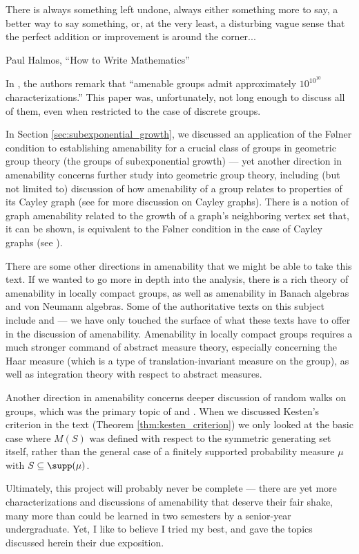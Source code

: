 \epigraph{There is always something left undone, always either something more to say, a better way to say something, or, at the very least, a disturbing vague sense that the perfect addition or improvement is around the corner...}{Paul Halmos, ``How to Write Mathematics''}
In \cite[48]{brown_and_ozawa}, the authors remark that ``amenable groups admit approximately $10^{10^{10}}$ characterizations.'' This paper was, unfortunately, not long enough to discuss all of them, even when restricted to the case of discrete groups.\newline

In Section \ref{sec:subexponential_growth}, we discussed an application of the Følner condition to establishing amenability for a crucial class of groups in geometric group theory (the groups of subexponential growth) --- yet another direction in amenability concerns further study into geometric group theory, including (but not limited to) discussion of how amenability of a group relates to properties of its Cayley graph (see \cite[Section 3.2]{loh_geometric_group_theory} for more discussion on Cayley graphs). There is a notion of graph amenability related to the growth of a graph's neighboring vertex set that, it can be shown, is equivalent to the Følner condition in the case of Cayley graphs (see \cite{monfared_cayley_graphs}).\newline

There are some other directions in amenability that we might be able to take this text. If we wanted to go more in depth into the analysis, there is a rich theory of amenability in locally compact groups, as well as amenability in Banach algebras and von Neumann algebras. Some of the authoritative texts on this subject include \cite{kazhdan_property_t} and \cite{amenable_banach_algebras} --- we have only touched the surface of what these texts have to offer in the discussion of amenability. Amenability in locally compact groups requires a much stronger command of abstract measure theory, especially concerning the Haar measure (which is a type of translation-invariant measure on the group), as well as integration theory with respect to abstract measures.\newline

Another direction in amenability concerns deeper discussion of random walks on groups, which was the primary topic of \cite{kesten_means} and \cite{kesten_random_walks}. When we discussed Kesten's criterion in the text (Theorem \ref{thm:kesten_criterion}) we only looked at the basic case where $M(S)$ was defined with respect to the symmetric generating set itself, rather than the general case of a finitely supported probability measure $\mu$ with $S\subseteq \supp(\mu)$.\newline

Ultimately, this project will probably never be complete --- there are yet more characterizations and discussions of amenability that deserve their fair shake, many more than could be learned in two semesters by a senior-year undergraduate. Yet, I like to believe I tried my best, and gave the topics discussed herein their due exposition.
